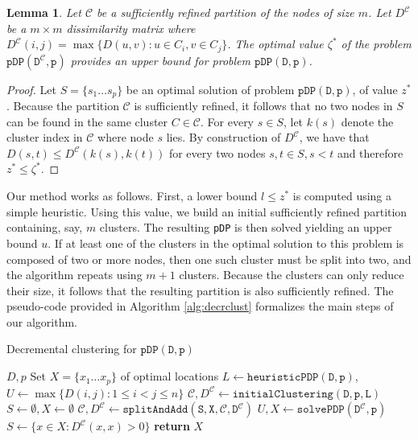 \documentclass[a4paper,10pt]{article}
\newtheorem{lemma}{\sffamily Lemma}
\newcommand{\pDP}{\texttt{pDP}}
\newcommand{\pdp}[2]{$\mathtt{pDP({#1}, {#2})}$}
\newcommand{\mC}{\mathcal{C}}
\newcommand{\DmC}{D^{\mC}}
\newcommand{\hpdp}[2]{$\mathtt{heuristicPDP({#1}, {#2})}$}
\newcommand{\initclust}[3]{$\mathtt{initialClustering({#1}, {#2}, {#3})}$}
\newcommand{\splitadd}[4]{$\mathtt{splitAndAdd({#1}, {#2}, {#3}, {#4})}$}
\newcommand{\solvePDP}[2]{$\mathtt{solvePDP({#1}, {#2})}$}
\begin{document}
\begin{lemma}
	Let $\mC$ be a sufficiently refined partition of the nodes of size $m$. Let $\DmC$ be a $m\times m$ dissimilarity matrix where $\DmC(i, j) = \max\{D(u, v): u\in C_i, v\in C_j\}$. The optimal value $\zeta^*$ of the problem \pdp{\DmC}{p} provides an upper bound for problem \pdp{D}{p}.
\end{lemma}
\begin{proof}
	Let $S = \{s_1\ldots s_p\}$ be an optimal solution of problem \pdp{D}{p}, of value $z^*$. Because the partition $\mC$ is sufficiently refined, it follows that no two nodes in $S$ can be found in the same cluster $C\in\mC$. For every $s\in S$, let $k(s)$ denote the cluster index in $\mC$ where node $s$ lies. By construction of $\DmC$, we have that $D(s, t)\leq \DmC(k(s), k(t))$ for every two nodes $s, t\in S, s < t$ and therefore $z^* \leq \zeta^*$.
\end{proof}

Our method works as follows. First, a lower bound $l \leq z^*$ is computed using a simple heuristic. Using this value, we build an initial sufficiently refined partition containing, say, $m$ clusters. The resulting \pDP{} is then solved yielding an upper bound $u$. If at least one of the clusters in the optimal solution to this problem is composed of two or more nodes, then one such cluster must be split into two, and the algorithm repeats using $m + 1$ clusters. Because the clusters can only reduce their size, it follows that the resulting partition is also sufficiently refined. The pseudo-code provided in Algorithm \ref{alg:decrclust} formalizes the main steps of our algorithm.%

\begin{algorithm}[H]
	\caption{Decremental clustering for \pdp{D}{p}\label{alg:decrclust}}
	\begin{algorithmic}\normalsize
		\Require $D, p$
		\Ensure Set $X = \{x_1\ldots x_p\}$ of optimal locations
		\State $L\leftarrow$\hpdp{D}{p}, $U\leftarrow\max\{D(i, j): 1\leq i < j \leq n\}$
		\State $\mC, \DmC\leftarrow$\initclust{D}{p}{L}
		\State $S\leftarrow\emptyset, X\leftarrow\emptyset$
		\Repeat
			\State $\mC, \DmC\leftarrow$\splitadd{S}{X}{\mC}{\DmC}
			\State $U, X\leftarrow$\solvePDP{\DmC}{p}
			\State $S\leftarrow\{x\in X : \DmC(x, x) > 0\}$
		\State \textbf{return} $X$
	\end{algorithmic}
\end{algorithm}
\end{document}
